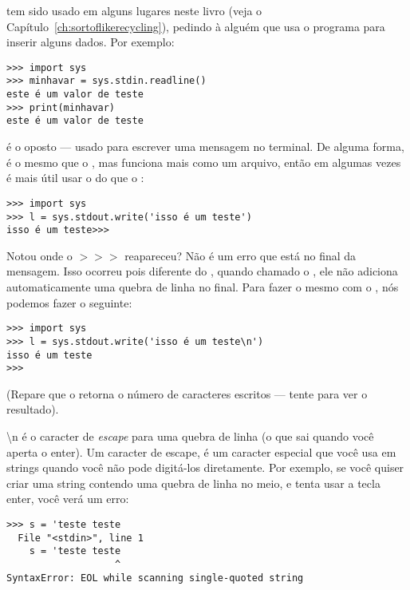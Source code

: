  tem sido usado em alguns lugares neste livro (veja o Capítulo~\ref{ch:sortoflikerecycling}), pedindo à alguém que usa o programa para inserir alguns dados. Por exemplo:

\begin{listingignore}
\begin{verbatim}
>>> import sys
>>> minhavar = sys.stdin.readline()
este é um valor de teste
>>> print(minhavar)
este é um valor de teste
\end{verbatim}
\end{listingignore}

 é o oposto --- usado para escrever uma mensagem no terminal. De alguma forma, é o mesmo que o , mas funciona mais como um arquivo, então em algumas vezes é mais útil usar o  do que o :

\begin{listingignore}
\begin{verbatim}
>>> import sys
>>> l = sys.stdout.write('isso é um teste')
isso é um teste>>>
\end{verbatim}
\end{listingignore}

Notou onde o $>>>$ reapareceu? Não é um erro que está no final da mensagem. Isso ocorreu pois diferente do , quando chamado o , ele não adiciona automaticamente uma quebra de linha no final. Para fazer o mesmo com o , nós podemos fazer o seguinte:

\begin{listingignore}
\begin{verbatim}
>>> import sys
>>> l = sys.stdout.write('isso é um teste\n')
isso é um teste
>>>
\end{verbatim}
\end{listingignore}

\noindent
(Repare que o  retorna o número de caracteres escritos --- tente  para ver o resultado).

\noindent
{\textbackslash}n é o caracter de \emph{escape} para uma quebra de linha (o que sai quando você aperta o enter). Um caracter de escape, é um caracter especial que você usa em strings quando você não pode digitá-los diretamente. Por exemplo, se você quiser criar uma string contendo uma quebra de linha no meio, e tenta usar a tecla enter, você verá um erro:

\begin{listing}
\begin{verbatim}
>>> s = 'teste teste
  File "<stdin>", line 1
    s = 'teste teste
                   ^
SyntaxError: EOL while scanning single-quoted string
\end{verbatim}
\end{listing}


